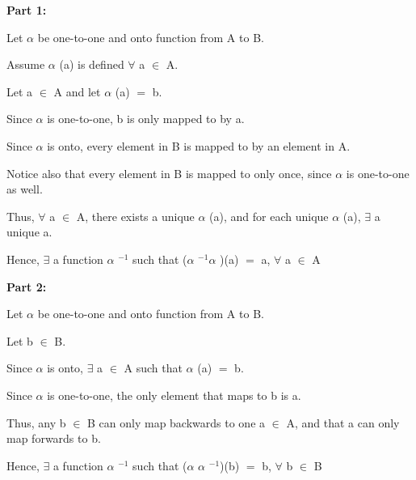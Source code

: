 \documentclass{article}
\newcommand{\mt}[1]{\ensuremath{#1}}
\newcommand{\fa}{\mt{\forall} }          %
\newcommand{\afa}{\mt{\alpha} }
\newcommand{\mem}{\mt{\in} }
\newcommand{\exs}{\mt{\exists} }
\newcommand{\eql}{\mt{=} }
\newcommand{\uf}[2]{#1\mt{^{#2}}}
\begin{document}
\begin{enumerate}
  \textbf{Part 1:}
  
  Let \afa be one-to-one and onto function from A to B.
  
  Assume \afa(a) is defined \fa a \mem A.
  
  Let a \mem A and let \afa(a) \eql b.
  
  Since \afa is one-to-one, b is only mapped to by a.
  
  Since \afa is onto, every element in B is mapped to by an element in A.
  
  Notice also that every element in B is mapped to only once, since \afa is one-to-one as well.
  
  Thus, \fa a \mem A, there exists a unique \afa(a), and for each unique \afa(a), \exs a unique a.
  
  Hence, \exs a function \uf{\afa}{-1} such that (\uf{\afa}{-1}\afa)(a) \eql a, \fa a \mem A
  
  \textbf{Part 2:}
  
  Let \afa be one-to-one and onto function from A to B.
  
  Let b \mem B.
  
  Since \afa is onto, \exs a \mem A such that \afa(a) \eql b.
  
  Since \afa is one-to-one, the only element that maps to b is a.
  
  Thus, any b \mem B can only map backwards to one a \mem A, and that a can only map forwards to b.
  
  Hence, \exs a function \uf{\afa}{-1} such that (\afa\uf{\afa}{-1})(b) \eql b, \fa b \mem B
  
\end{enumerate}
\end{document}
